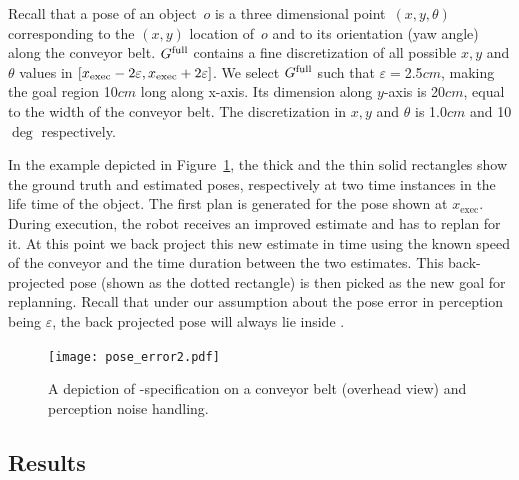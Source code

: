 \documentclass[a4paper]{report}
\begin{document}
%
Recall that a pose of an object~$o$ is a three dimensional point~$(x,y,\theta)$ corresponding to the $(x,y)$ location of~$o$ and to its orientation (yaw angle) along the conveyor belt.
%
$G^{\textrm{full}}$ contains a fine discretization of all possible $x,y$ and $\theta$ values in  $[x_{\textrm{exec}}-2\varepsilon, x_{\textrm{exec}}+2\varepsilon]$.
We select $G^{\textrm{full}}$ such that $\varepsilon = $2.5$cm$, making the goal region 10$cm$ long along x-axis. Its dimension along $y$-axis is 20$cm$, equal to the width of the conveyor belt. The discretization in $x,y$ and $\theta$ is 1.0$cm$ and 10$\deg$ respectively.

In the example depicted in Figure~\ref{fig:pe}, the thick and the thin solid rectangles show the ground truth and estimated poses, respectively at two time instances in the life time of the object.
%
The first plan is generated for the pose shown at $x_{\textrm{exec}}$. During execution, the robot receives an improved estimate and has to replan for it. At this point we back project this new estimate in time using the known speed of the conveyor and the time duration between the two estimates. This back-projected pose (shown as the dotted rectangle) is then picked as the new goal for replanning. Recall that under our assumption about the pose error in perception being $\varepsilon$, the back projected pose will always lie inside \Gfull.
%



\begin{figure}
    \centering
     \texttt{[image: pose\_error2.pdf]}
    \caption{\CaptionTextSize A depiction of \Gfull-specification on a conveyor belt (overhead view) and perception noise handling. 
    }
    \label{fig:pe}
\end{figure}

\subsection{Results}
%
\end{document}
